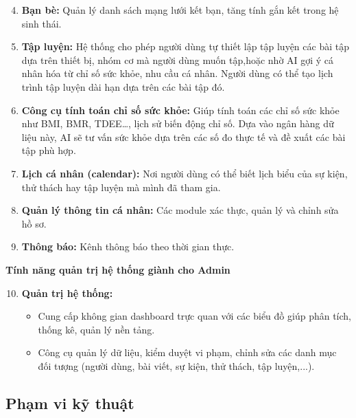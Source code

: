 \begin{enumerate}
\setcounter{enumi}{3}
    \item \textbf{Bạn bè:} Quản lý danh sách mạng lưới kết bạn, tăng tính gắn kết trong hệ sinh thái.

    \item \textbf{Tập luyện:} Hệ thống cho phép người dùng tự thiết lập tập luyện các bài tập dựa trên thiết bị, nhóm cơ mà người dùng muốn tập,hoặc nhờ AI gợi ý cá nhân hóa từ chỉ số sức khỏe, nhu cầu cá nhân. Người dùng có thể tạo lịch trình tập luyện dài hạn dựa trên các bài tập đó.

    \item \textbf{Công cụ tính toán chỉ số sức khỏe:} Giúp tính toán các chỉ số sức khỏe như BMI, BMR, TDEE\ldots, lịch sử biến động chỉ số. Dựa vào ngân hàng dữ liệu này, AI sẽ tư vấn sức khỏe dựa trên các số đo thực tế và đề xuất các bài tập phù hợp.

    \item \textbf{Lịch cá nhân (calendar):} Nơi người dùng có thể biết lịch biểu của sự kiện, thử thách hay tập luyện mà mình đã tham gia.  

    \item \textbf{Quản lý thông tin cá nhân:} Các module xác thực, quản lý và chỉnh sửa hồ sơ.

    \item \textbf{Thông báo:} Kênh thông báo theo thời gian thực.
\end{enumerate}

\textbf{Tính năng quản trị hệ thống giành cho Admin}

\begin{enumerate}
\setcounter{enumi}{9}
    \item \textbf{Quản trị hệ thống:} 
    \begin{itemize}
        \item Cung cấp không gian dashboard trực quan với các biểu đồ giúp phân tích, thống kê, quản lý nền tảng.
        \item Công cụ quản lý dữ liệu, kiểm duyệt vi phạm, chỉnh sửa các danh mục đối tượng (người dùng, bài viết, sự kiện, thử thách, tập luyện,...).
    \end{itemize}
\end{enumerate}

\subsection{Phạm vi kỹ thuật}
\label{subsec:intro:technical_scope}

